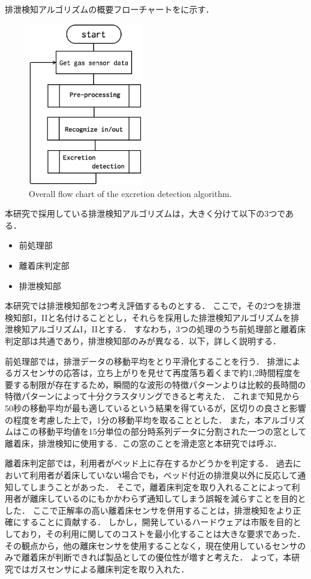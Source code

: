 排泄検知アルゴリズムの概要フローチャートをに示す．
\begin{figure}[t]
\centering
\includegraphics[width=5cm]{./fig/algoflow.eps}
\caption{Overall flow chart of the excretion detection algorithm.}
\label{algo_flow}
\end{figure}

本研究で採用している排泄検知アルゴリズムは，大きく分けて以下の3つである．
\begin{itemize}
\item 前処理部
\item 離着床判定部
\item 排泄検知部
\end{itemize}
\par

本研究では排泄検知部を2つ考え評価するものとする．
ここで，その2つを排泄検知部I，I\hspace{-.1em}Iと名付けることとし，それらを採用した排泄検知アルゴリズムを排泄検知アルゴリズムI，I\hspace{-.1em}Iとする．
すなわち，3つの処理のうち前処理部と離着床判定部は共通であり，排泄検知部のみが異なる．以下，詳しく説明する．

前処理部では，排泄データの移動平均をとり平滑化することを行う．
排泄によるガスセンサの応答は，立ち上がりを見せて再度落ち着くまで約1,2時間程度を要する制限が存在するため，瞬間的な波形の特徴パターンよりは比較的長時間の特徴パターンによって十分クラスタリングできると考えた．
これまで知見から50秒の移動平均が最も適しているという結果を得ているが，区切りの良さと影響の程度を考慮した上で，1分の移動平均を取ることとした．
また，本アルゴリズムはこの移動平均値を15分単位の部分時系列データに分割された一つの窓として離着床，排泄検知に使用する．この窓のことを滑走窓と本研究では呼ぶ．

離着床判定部では，利用者がベッド上に存在するかどうかを判定する．
過去において利用者が着床していない場合でも，ベッド付近の排泄臭以外に反応して通知してしまうことがあった．
そこで，離着床判定を取り入れることによって利用者が離床しているのにもかかわらず通知してしまう誤報を減らすことを目的とした．
ここで正解率の高い離着床センサを併用することは，排泄検知をより正確にすることに貢献する．
しかし，開発しているハードウェアは市販を目的としており，その利用に関してのコストを最小化することは大きな要求であった．
その観点から，他の離床センサを使用することなく，現在使用しているセンサのみで離着床が判断できれば製品としての優位性が増すと考えた．
よって，本研究ではガスセンサによる離床判定を取り入れた．

